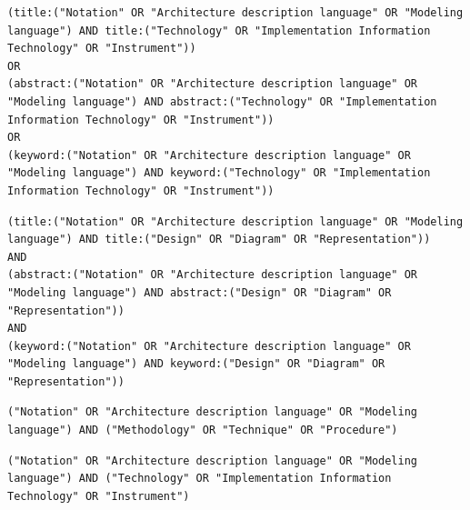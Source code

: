 \begin{tcolorbox}[
	colback=gray!5,
	colframe=black!60,
	title=Cadena de búsqueda en Springer para ``Tecnología'',
	fonttitle=\bfseries,
	sharp corners=south
]
\scriptsize
\begin{lstlisting}[breaklines=true]
(title:("Notation" OR "Architecture description language" OR "Modeling language") AND title:("Technology" OR "Implementation Information Technology" OR "Instrument"))
OR
(abstract:("Notation" OR "Architecture description language" OR "Modeling language") AND abstract:("Technology" OR "Implementation Information Technology" OR "Instrument"))
OR 
(keyword:("Notation" OR "Architecture description language" OR "Modeling language") AND keyword:("Technology" OR "Implementation Information Technology" OR "Instrument"))
\end{lstlisting}
\end{tcolorbox}

\begin{tcolorbox}[
	colback=gray!5,
	colframe=black!60,
	title=Cadena de búsqueda en Springer para ``Diseño'',
	fonttitle=\bfseries,
	sharp corners=south
]
\scriptsize
\begin{lstlisting}[breaklines=true]
(title:("Notation" OR "Architecture description language" OR "Modeling language") AND title:("Design" OR "Diagram" OR "Representation")) 
AND
(abstract:("Notation" OR "Architecture description language" OR "Modeling language") AND abstract:("Design" OR "Diagram" OR "Representation")) 
AND 
(keyword:("Notation" OR "Architecture description language" OR "Modeling language") AND keyword:("Design" OR "Diagram" OR "Representation")) 
\end{lstlisting}
\end{tcolorbox}

\begin{tcolorbox}[
	colback=gray!5,
	colframe=black!60,
	title=Cadena de búsqueda en ScienceDirect para ``Metodología'',
	fonttitle=\bfseries,
	sharp corners=south
]
\scriptsize
\begin{lstlisting}[breaklines=true]
("Notation" OR "Architecture description language" OR "Modeling language") AND ("Methodology" OR "Technique" OR "Procedure")
\end{lstlisting}
\end{tcolorbox}

\begin{tcolorbox}[
	colback=gray!5,
	colframe=black!60,
	title=Cadena de búsqueda en ScienceDirect para ``Tecnología'',
	fonttitle=\bfseries,
	sharp corners=south
]
\scriptsize
\begin{lstlisting}[breaklines=true]
("Notation" OR "Architecture description language" OR "Modeling language") AND ("Technology" OR "Implementation Information Technology" OR "Instrument")
\end{lstlisting}
\end{tcolorbox}

